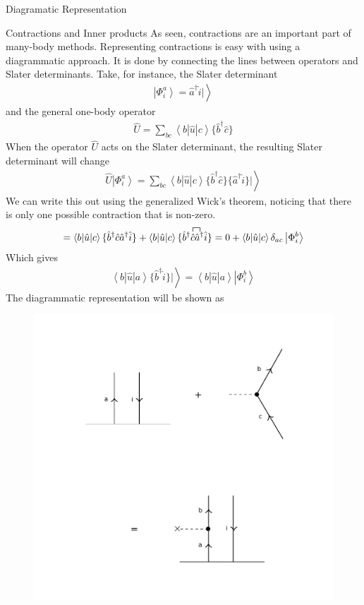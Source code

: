 \documentclass[twoside,english]{uiofysmaster}
\begin{document}
\begin{chapter}{Diagramatic Representation}
	\begin{section}{Contractions and Inner products}
		As seen, contractions are an important part of many-body methods. Representing contractions is easy with using a diagrammatic approach. It is done by connecting the lines between operators and Slater determinants. Take, for instance, the Slater determinant \cite{Audun,ShavittAndBartlett}
		\begin{align}
			\left| \Phi_i^a \right> = \hat a^\dagger \hat i | \left. \right> 
		\end{align}
		and the general one-body operator 
		\begin{align}
			\hat U = \sum_{bc} \left< b | \hat u | c \right> \{ \hat b^\dagger \hat c \}
		\end{align}
		When the operator $\hat U$ acts on the Slater determinant, the resulting Slater determinant will change 
		\begin{align}
			\hat U \left| \Phi_i^a \right> = \sum_{bc} \left< b | \hat u | c \right> \{ \hat b^\dagger \hat c \} \{ \hat a^\dagger \hat i \} | \left. \right>
		\end{align}
		We can write this out using the generalized Wick's theorem, noticing that there is only one possible contraction that is non-zero. 
		\begin{align}
			= \left< b | \hat u | c \right> \{ \hat b^\dagger \hat c \hat a^\dagger \hat i \} + \left< b | \hat u | c \right> \{ \hat b^\dagger \contraction{}{\hat c}{}{\hat a^\dagger}
			\hat c \hat a^\dagger \hat i \} = 0 + \left< b | \hat u | c \right> \delta_{ac} \left| \Phi_i^b \right>
		\end{align}
		Which gives
		\begin{align}
			\left< b | \hat u | a \right> \{ \hat b^\dagger \hat i \} | \left. \right> = \left< b | \hat u | a \right> \left| \Phi_i^b \right>
		\end{align}
		The diagrammatic representation will be shown as 
		\newpage
		\begin{figure}[H]
			\includegraphics[width=\textwidth]{Figures/Contraction.pdf}

\end{figure}
\end{section}
\end{chapter}
\end{document}
